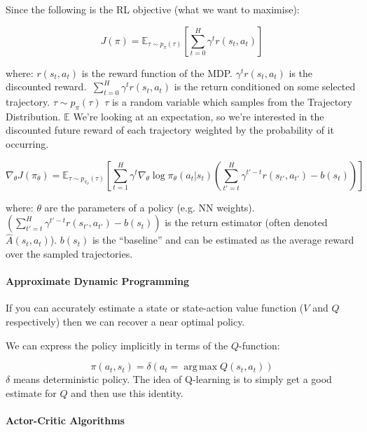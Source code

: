 \documentclass{article}
\DeclareMathOperator*{\argmax}{arg\,max}
\begin{document}
Since the following is the RL objective (what we want to maximise):

\begin{equation}
\label{eq:1}
J(\pi) = \mathbb{E}_{\tau \sim p_\pi (\tau)} \left[ \sum_{t=0}^H \gamma^t r(s_t, a_t) \right ]
\end{equation}

where: \(r(s_t, a_t)\) is the reward function of the MDP. \(\gamma^t r(s_t , a_t)\) is the discounted reward. \(\ \sum_{t=0}^H \gamma^t r(s_t, a_t) \) is the return conditioned on some selected trajectory. \(\tau \sim p_\pi(\tau)\)
\(\tau\) is a random variable which samples from the Trajectory Distribution. \(\mathbb{E}\) We're looking at an expectation, so we're interested in the discounted future reward of each trajectory weighted by the probability of it occurring.

\begin{equation}
\label{eq:2}
\nabla_\theta J(\pi_\theta) = \mathbb{E}_{\tau \sim p_{\pi_\theta} (\tau)} \left [ \sum_{t=1}^H \gamma^t \nabla_\theta \log \pi_\theta (a_t | s_t) \left( \sum_{t' = t}^H \gamma^{t'-t} r(s_{t'}, a_{t'}) - b(s_t) \right) \right]
\end{equation}

where: \(\theta\) are the parameters of a policy (e.g. NN weights). \( \left( \sum_{t' = t}^H \gamma^{t'-t} r(s_{t'}, a_{t'}) - b(s_t) \right) \) is the return estimator (often denoted \(\hat{A}(s_{t}, a_{t})\)). \(b(s_{t})\) is the ``baseline'' and can be estimated as the average reward over the sampled trajectories.

\paragraph{Approximate Dynamic Programming}

If you can accurately estimate a state or state-action value function (\(V\) and \(Q\) respectively) then we can recover a near optimal policy.

We can express the policy implicitly in terms of the \(Q\)-function:

\begin{equation}
  \label{eq:3}
  \pi(a_{t}, s_{t}) = \delta(a_{t} = \argmax Q (s_{t}, a_{t}) )
\end{equation}
\(\delta\) means deterministic policy.
The idea of Q-learning is to simply get a good estimate for \(Q\) and then use this identity.


\paragraph{Actor-Critic Algorithms}
\end{document}
